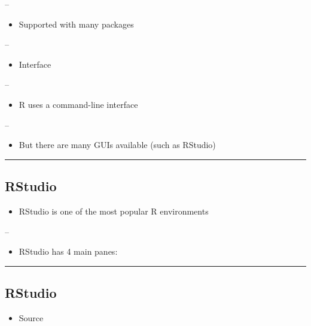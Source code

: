 \documentclass[]{article}
\providecommand{\tightlist}{%
  \setlength{\itemsep}{0pt}\setlength{\parskip}{0pt}}
\begin{document}
--

\begin{itemize}
\tightlist
\item
  Supported with many packages
\end{itemize}

--

\begin{itemize}
\tightlist
\item
  Interface
\end{itemize}

--

\begin{itemize}
\tightlist
\item
  R uses a command-line interface
\end{itemize}

--

\begin{itemize}
\tightlist
\item
  But there are many GUIs available (such as RStudio)
\end{itemize}

\begin{center}\rule{0.5\linewidth}{\linethickness}\end{center}

\hypertarget{rstudio}{%
\subsection{RStudio}\label{rstudio}}

\begin{itemize}
\tightlist
\item
  RStudio is one of the most popular R environments
\end{itemize}

--

\begin{itemize}
\tightlist
\item
  RStudio has 4 main panes:
\end{itemize}

\begin{center}\rule{0.5\linewidth}{\linethickness}\end{center}

\hypertarget{rstudio-1}{%
\subsection{RStudio}\label{rstudio-1}}

\begin{itemize}
\tightlist
\item
  Source
\end{itemize}
\end{document}
